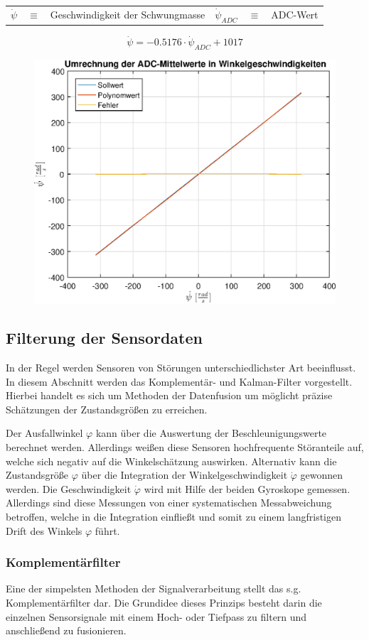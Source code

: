 \begin{table}[h!]
\centering
\begin{tabular}{lcllcl}
$\dot{\psi}$ & $\equiv$ & Geschwindigkeit der Schwungmasse & $\dot{\psi}_{ADC}$ & $\equiv$ & ADC-Wert
\end{tabular}
\end{table}

\begin{equation}
\dot{\psi} = -0.5176 \cdot \dot{\psi}_{ADC} + 1017
\end{equation}

\begin{figure}[h!]
\centering
	\includegraphics[width=0.5\linewidth]{img/ADC_mittelwert_polynom.eps}
\end{figure}

\subsection{Filterung der Sensordaten}
In der Regel werden Sensoren von Störungen unterschiedlichster Art beeinflusst. In diesem Abschnitt werden das Komplementär- und Kalman-Filter vorgestellt. Hierbei handelt es sich um Methoden der Datenfusion um möglicht präzise Schätzungen der Zustandsgrößen zu erreichen.

Der Ausfallwinkel $\varphi$ kann über die Auswertung der Beschleunigungswerte berechnet werden. Allerdings weißen diese Sensoren hochfrequente Störanteile auf, welche sich negativ auf die Winkelschätzung auswirken. Alternativ kann die Zustandsgröße $\varphi$ über die Integration der Winkelgeschwindigkeit $\dot{\varphi}$ gewonnen werden. Die Geschwindigkeit $\dot{\varphi}$ wird mit Hilfe der beiden Gyroskope gemessen. Allerdings sind diese Messungen von einer systematischen Messabweichung betroffen, welche in die Integration einfließt und somit zu einem langfristigen Drift des Winkels $\varphi$ führt.

\subsubsection{Komplementärfilter}
Eine der simpelsten Methoden der Signalverarbeitung stellt das s.g. Komplementärfilter dar. Die Grundidee dieses Prinzips besteht darin die einzelnen Sensorsignale mit einem Hoch- oder Tiefpass zu filtern und anschließend zu fusionieren. 


